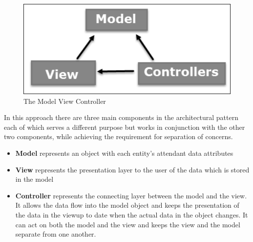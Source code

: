 \documentclass[a4paper,12pt]{article}
\begin{document}
 \begin{figure}[h!]

\includegraphics{mvc.jpg}
  \caption{The Model View Controller}
  \label{fig:model view controller}
\end{figure}
In this approach there are three main components in the architectural pattern each of which serves a different purpose but works in conjunction with the other two components, while achieving the requirement for separation of concerns.

\begin{itemize}
\item \textbf{Model} represents an object with each entity's attendant data attributes 
\item \textbf{View} represents the presentation layer to the user of the data which is stored in the model
\item \textbf{Controller} represents the connecting layer between the model and the view. It allows the data flow into the model object and keeps the presentation of the data in the viewup to date when the actual data in the object changes. It can act on both the model and the view and keeps the view and the model separate from one another.
\end{itemize}
\end{document}
